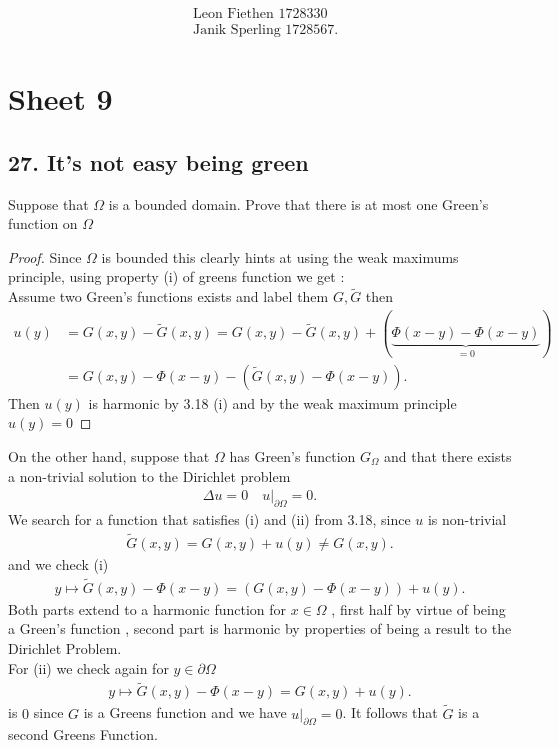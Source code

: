 \begin{align*}
  &\text{Leon Fiethen 1728330}\\
 &\text{Janik Sperling 1728567}
.\end{align*}
\section*{Sheet 9}
\subsection*{27. It's not easy being green}
\begin{exercise}
Suppose that $\Omega $ is a bounded domain. Prove that there is at most one Green's function on $\Omega $  
\end{exercise}
\begin{proof}
Since $\Omega $ is bounded this clearly hints at using the weak maximums principle, using property (i) of greens function we get : \\
Assume two Green's functions exists and label them $G,\tilde{G} $ then 
\begin{align*}
  u(y) &= G(x,y) - \tilde{G}(x,y) = G(x,y)-\tilde{G}(x,y) + (\underbrace{\Phi(x-y) - \Phi(x-y)}_{=0}) \\
       &= G(x,y)-\Phi(x-y)  - (\tilde{G}(x,y) - \Phi(x-y) )
.\end{align*}
Then $u(y)$ is harmonic by 3.18 (i) and by the weak maximum principle $u(y)=  0$
\end{proof}
\begin{exercise}
  On the other hand, suppose that $\Omega $  has Green's function $G_{\Omega }$ and that there exists a non-trivial solution to the Dirichlet problem
  \begin{align*}
    \Delta u  = 0 \quad u \rvert_{\partial \Omega } = 0
  .\end{align*}
  We search for a function that satisfies (i) and (ii) from 3.18, since $u$ is non-trivial 
  \begin{align*}
    \tilde{G}(x,y) = G(x,y) + u(y)  \neq G(x,y)
  .\end{align*}
  and we check (i) 
  \begin{align*}
    y \mapsto \tilde{G}(x,y)  - \Phi(x-y) =  (G(x,y)-\Phi(x-y)) + u(y)
  .\end{align*}
  Both parts extend to a harmonic function  for $x \in  \Omega $ , first half  by virtue of being a Green's function , second part is harmonic by properties of being a result to the Dirichlet Problem.\\[1ex]
  For (ii) we check again for $y \in  \partial \Omega $
  \begin{align*}
    y \mapsto \tilde{G}(x,y)  - \Phi(x-y) =  G(x,y) + u(y)
  .\end{align*}
  is $0$ since $G$ is a  Greens function and we have $u \rvert_{\partial \Omega } = 0$. 
  It follows that $\tilde{G} $ is a second Greens Function.
\end{exercise}
